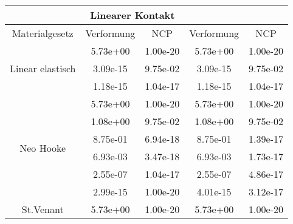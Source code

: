 \begin{table} 
\centering 
\begin{tabular}{c|cc|cc|} 
\cline{2-5} 
 & \multicolumn{2}{|c|}{Linearer Kontakt} &  \\ 
\hline 
\multicolumn{1}{|c|}{Materialgesetz} & \multicolumn{1}{c|}{Verformung} & \multicolumn{1}{c|}{NCP} & \multicolumn{1}{c|}{Verformung} & \multicolumn{1}{c|}{NCP} \\ 
\hline 
\multicolumn{1}{|c|}{\multirow{3}{*}{Linear elastisch}} &\multicolumn{1}{|c|}{  5.73e+00} & \multicolumn{1}{|c|}{  1.00e-20} & \multicolumn{1}{|c|}{  5.73e+00} & \multicolumn{1}{|c|}{  1.00e-20} \\ 
\multicolumn{1}{|c|}{} & \multicolumn{1}{|c|}{  3.09e-15} & \multicolumn{1}{|c|}{  9.75e-02} & \multicolumn{1}{|c|}{  3.09e-15} & \multicolumn{1}{|c|}{  9.75e-02} \\ 
\multicolumn{1}{|c|}{} & \multicolumn{1}{|c|}{  1.18e-15} & \multicolumn{1}{|c|}{  1.04e-17} & \multicolumn{1}{|c|}{  1.18e-15} & \multicolumn{1}{|c|}{  1.04e-17} \\ 
\hline 
\multicolumn{1}{|c|}{\multirow{6}{*}{Neo Hooke}} &\multicolumn{1}{|c|}{  5.73e+00} & \multicolumn{1}{|c|}{  1.00e-20} & \multicolumn{1}{|c|}{  5.73e+00} & \multicolumn{1}{|c|}{  1.00e-20} \\ 
\multicolumn{1}{|c|}{} & \multicolumn{1}{|c|}{  1.08e+00} & \multicolumn{1}{|c|}{  9.75e-02} & \multicolumn{1}{|c|}{  1.08e+00} & \multicolumn{1}{|c|}{  9.75e-02} \\ 
\multicolumn{1}{|c|}{} & \multicolumn{1}{|c|}{  8.75e-01} & \multicolumn{1}{|c|}{  6.94e-18} & \multicolumn{1}{|c|}{  8.75e-01} & \multicolumn{1}{|c|}{  1.39e-17} \\ 
\multicolumn{1}{|c|}{} & \multicolumn{1}{|c|}{  6.93e-03} & \multicolumn{1}{|c|}{  3.47e-18} & \multicolumn{1}{|c|}{  6.93e-03} & \multicolumn{1}{|c|}{  1.73e-17} \\ 
\multicolumn{1}{|c|}{} & \multicolumn{1}{|c|}{  2.55e-07} & \multicolumn{1}{|c|}{  1.04e-17} & \multicolumn{1}{|c|}{  2.55e-07} & \multicolumn{1}{|c|}{  4.86e-17} \\ 
\multicolumn{1}{|c|}{} & \multicolumn{1}{|c|}{  2.99e-15} & \multicolumn{1}{|c|}{  1.00e-20} & \multicolumn{1}{|c|}{  4.01e-15} & \multicolumn{1}{|c|}{  3.12e-17} \\ 
\hline 
\multicolumn{1}{|c|}{\multirow{6}{*}{St.Venant}} &\multicolumn{1}{|c|}{  5.73e+00} & \multicolumn{1}{|c|}{  1.00e-20} & \multicolumn{1}{|c|}{  5.73e+00} & \multicolumn{1}{|c|}{  1.00e-20} \\ 

\end{tabular}
\end{table}
